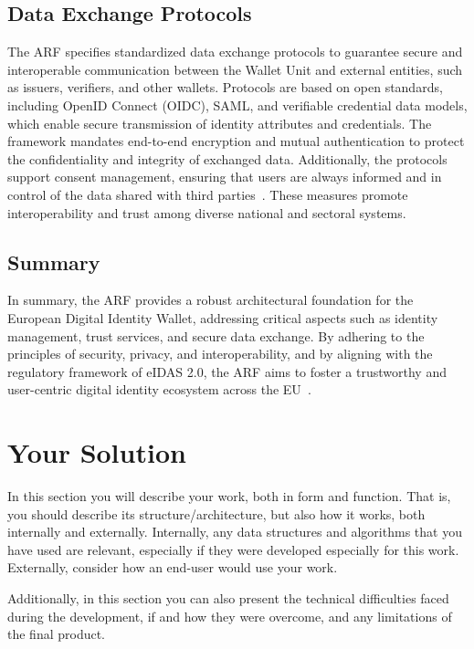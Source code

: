 \documentclass[sigconf,balance,nonacm,authordraft]{acmart}
\begin{document}
\subsection{Data Exchange Protocols}
The ARF specifies standardized data exchange protocols to guarantee secure and interoperable communication between the Wallet Unit and external entities, such as issuers, verifiers, and other wallets. Protocols are based on open standards, including OpenID Connect (OIDC), SAML, and verifiable credential data models, which enable secure transmission of identity attributes and credentials. The framework mandates end-to-end encryption and mutual authentication to protect the confidentiality and integrity of exchanged data. Additionally, the protocols support consent management, ensuring that users are always informed and in control of the data shared with third parties~\cite{EU_ARF2024}. These measures promote interoperability and trust among diverse national and sectoral systems.

\subsection{Summary}
In summary, the ARF provides a robust architectural foundation for the European Digital Identity Wallet, addressing critical aspects such as identity management, trust services, and secure data exchange. By adhering to the principles of security, privacy, and interoperability, and by aligning with the regulatory framework of eIDAS 2.0, the ARF aims to foster a trustworthy and user-centric digital identity ecosystem across the EU~\cite{EU_ARF2024,EU_eIDAS2024}.
\section{Your Solution}
\label{sec:solution}
In this section you will describe your work, both in form and function. That is, you should describe its structure/architecture, but also how it works, both internally and externally. Internally, any data structures and algorithms that you have used are relevant, especially if they were developed especially for this work. Externally, consider how an end-user would use your work.

Additionally, in this section you can also present the technical difficulties faced during the development, if and how they were overcome, and any limitations of the final product.
\end{document}
